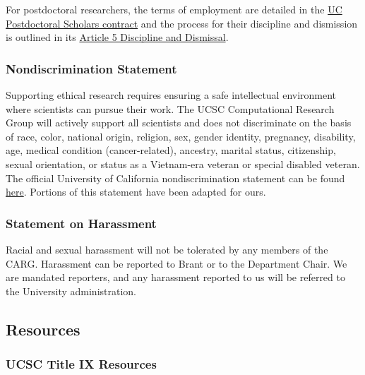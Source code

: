 \noindent
For postdoctoral researchers, the terms of employment are detailed in the
\href{https://ucnet.universityofcalifornia.edu/resources/employment-policies-contracts/bargaining-units/postdoctoral-scholars/contract/}{UC Postdoctoral Scholars contract} and the process
for their discipline and dismission is outlined in its 
\href{https://ucnet.universityofcalifornia.edu/wp-content/uploads/labor/bargaining-units/px/docs/px_tentative_agremeents_effective_12-09-2022.pdf}{Article 5 Discipline and Dismissal}.

\subsubsection{Nondiscrimination Statement}

Supporting ethical research requires ensuring a safe intellectual
environment where scientists can pursue their work. The UCSC
Computational Research Group will actively support all scientists
and does not discriminate on the 
basis of race, color, national origin, religion, sex, gender identity,
pregnancy, disability, age, medical condition (cancer-related), ancestry,
marital status, citizenship, sexual orientation, or status as a Vietnam-era
veteran or special disabled veteran.\\

\noindent
The official University of California nondiscrimination statement can
be found \href{https://www.ucop.edu/operating-budget/fees-and-enrollments/policies-and-resources/nondiscrimination-statement.html}{here}. Portions of this statement have been 
adapted for ours.

\subsubsection{Statement on Harassment}

Racial and sexual harassment will not be tolerated by any members of
the CARG. Harassment can be reported to Brant or to the Department Chair.
We are mandated reporters, and any harassment reported to us will be
referred to the University administration.

\subsection{Resources}

\subsubsection{UCSC Title IX Resources}

